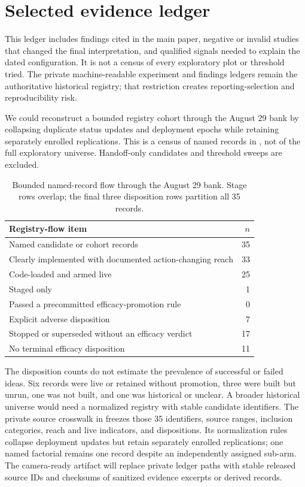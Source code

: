 \section{Selected evidence ledger}
\label{app:ledger}

This ledger includes findings cited in the main paper, negative or invalid
studies that changed the final interpretation, and qualified signals needed to
explain the dated configuration. It is not a census of every exploratory plot
or threshold tried. The private machine-readable experiment and findings
ledgers remain the authoritative historical registry; that restriction creates
reporting-selection and reproducibility risk.

We could reconstruct a bounded registry cohort through the August 29 bank by
collapsing duplicate status updates and deployment epochs while retaining
separately enrolled replications. This is a census of named records in
, not of the full exploratory universe. Handoff-only
candidates and threshold sweeps are excluded.

\begin{table}[h]
\centering
\small
\caption{Bounded named-record flow through the August 29 bank. Stage
rows overlap; the final three disposition rows partition all 35 records.}
\label{tab:registry_flow}
\begin{tabular}{@{}lr@{}}
\toprule
Registry-flow item & $n$ \\
\midrule
Named candidate or cohort records & 35 \\
Clearly implemented with documented action-changing reach & 33 \\
Code-loaded and armed live & 25 \\
Staged only & 1 \\
Passed a precommitted efficacy-promotion rule & 0 \\
Explicit adverse disposition & 7 \\
Stopped or superseded without an efficacy verdict & 17 \\
No terminal efficacy disposition & 11 \\
\bottomrule
\end{tabular}
\end{table}

The disposition counts do not estimate the prevalence of successful or failed
ideas. Six records were live or retained without promotion, three were built but
unrun, one was not built, and one was historical or unclear. A broader historical
universe would need a normalized registry with stable candidate identifiers.
The private source crosswalk in
 freezes those 35 identifiers,
source ranges, inclusion categories, reach and live indicators, and dispositions.
Its normalization rules collapse deployment updates but retain separately enrolled
replications; one named factorial remains one record despite an independently
assigned sub-arm. The camera-ready artifact will replace private ledger paths
with stable released source IDs and checksums of sanitized evidence excerpts or
derived records.

